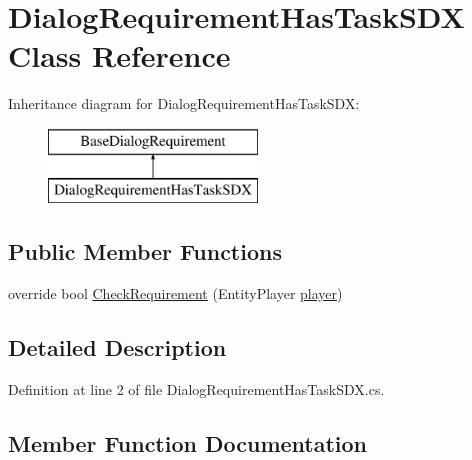 \hypertarget{class_dialog_requirement_has_task_s_d_x}{}\section{Dialog\+Requirement\+Has\+Task\+S\+DX Class Reference}
\label{class_dialog_requirement_has_task_s_d_x}
Inheritance diagram for Dialog\+Requirement\+Has\+Task\+S\+DX\+:\begin{figure}[H]
\begin{center}
\leavevmode
\includegraphics[height=2.000000cm]{d1/de5/class_dialog_requirement_has_task_s_d_x}
\end{center}
\end{figure}
\subsection*{Public Member Functions}
\begin{DoxyCompactItemize}
\item 
override bool \mbox{\hyperlink{class_dialog_requirement_has_task_s_d_x_abf1f40228832a9cb7ed65bfef8c58b8b}{Check\+Requirement}} (Entity\+Player \mbox{\hyperlink{_sphere_i_i_01_music_01_boxes_2_config_2_localization_8txt_a4e2cb8aeff651600ea1cc57fe5a929a4}{player}})
\end{DoxyCompactItemize}


\subsection{Detailed Description}


Definition at line 2 of file Dialog\+Requirement\+Has\+Task\+S\+D\+X.\+cs.



\subsection{Member Function Documentation}
\mbox{\label{class_dialog_requirement_has_task_s_d_x_abf1f40228832a9cb7ed65bfef8c58b8b}} 
